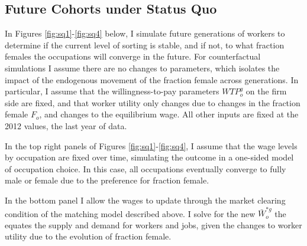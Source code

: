 \documentclass[11pt]{article}
\begin{document}
\subsection{Future Cohorts under Status Quo}


In Figures \ref{fig:sq1}-\ref{fig:sq4} below, I simulate future generations of workers to determine if the current level of sorting is stable, and if not, to what fraction females the occupations will converge in the future. For counterfactual simulations I assume there are no changes to parameters, which isolates the impact of the endogenous movement of the fraction female across generations. In particular, I assume that the willingness-to-pay parameters $WTP^g_o$ on the firm side are fixed, and that worker utility only changes due to changes in the fraction female $F_o$, and changes to the equilibrium wage. All other inputs are fixed at the 2012 values, the last year of data. 




In the top right panels of Figures \ref{fig:sq1}-\ref{fig:sq4}, I assume that the wage levels by occupation are fixed over time, simulating the outcome in a one-sided model of occupation choice. In this case, all occupations eventually converge to fully male or female due to the preference for fraction female.



In the bottom panel I allow the wages to update through the market clearing condition of the matching model described above. I solve for the new $ \bar{W}^{*g}_o$ the equates the supply and demand for workers and jobs, given the changes to worker utility due to the evolution of fraction female. 


\end{document}
